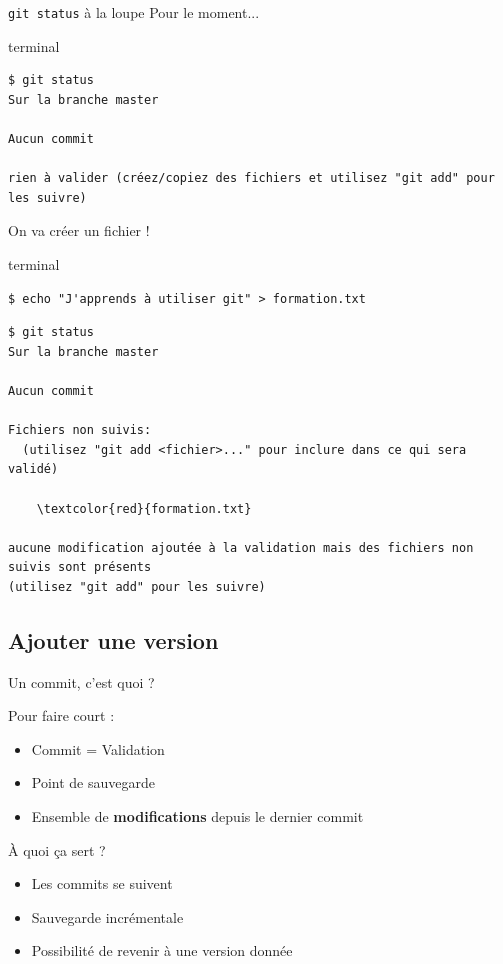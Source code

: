 \documentclass[usepdftitle=false]{beamer}
\def\seplength{.3\topsep}
\newcommand{\Pause}{%
\ifdef{\Release}
  {\pause}
  {}
}
\begin{document}
\begin{frame}[fragile]{\texttt{git status} à la loupe}
	Pour le moment...

	\begin{beamercolorbox}[rounded=true,shadow=true]{terminal}
\vspace{-\seplength}
\begin{Verbatim}
$ git status
Sur la branche master

Aucun commit

rien à valider (créez/copiez des fichiers et utilisez "git add" pour les suivre)
\end{Verbatim}
	\end{beamercolorbox}

	On va créer un fichier !

	\begin{beamercolorbox}[rounded=true,shadow=true]{terminal}
\vspace{-\seplength}
\begin{Verbatim}
$ echo "J'apprends à utiliser git" > formation.txt
\end{Verbatim}
\Pause
\vspace{-\seplength}
\begin{Verbatim}
$ git status
Sur la branche master

Aucun commit

Fichiers non suivis:
  (utilisez "git add <fichier>..." pour inclure dans ce qui sera validé)

	\textcolor{red}{formation.txt}

aucune modification ajoutée à la validation mais des fichiers non suivis sont présents
(utilisez "git add" pour les suivre)

\end{Verbatim}
\end{beamercolorbox}

\end{frame}

\subsection{Ajouter une version}

\begin{frame}{Un commit, c'est quoi ?}

Pour faire court :
\begin{itemize}
\item Commit = Validation
\item Point de sauvegarde
\item Ensemble de \textbf{modifications} depuis le dernier commit
\end{itemize}

\bigskip

\`A quoi ça sert ?
\begin{itemize}
\item Les commits se suivent
\item Sauvegarde incrémentale
\item Possibilité de revenir à une version donnée
\end{itemize}
\end{frame}
\end{document}
